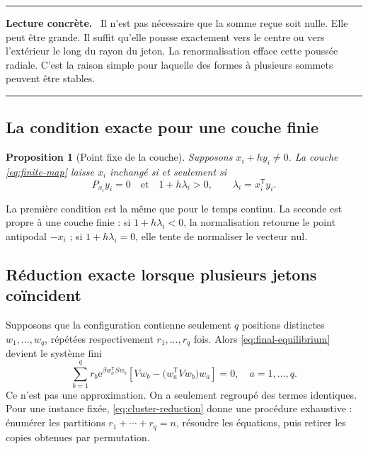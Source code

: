 \documentclass[11pt,a4paper]{article}
\newtheorem{proposition}[theorem]{Proposition}
\theoremstyle{definition}
\newcommand{\e}{\mathrm e}
\newcommand{\T}{\mathsf T}
\newenvironment{plainbox}
{\begin{center}\begin{minipage}{0.92\textwidth}\color{deepblue}\hrule\vspace{0.45em}\small\textbf{Lecture concrète.}\ \color{black}}
{\vspace{0.35em}\color{deepblue}\hrule\color{black}\end{minipage}\end{center}}
\begin{document}
\begin{plainbox}
Il n'est pas nécessaire que la somme reçue soit nulle. Elle peut être grande. Il suffit
qu'elle pousse exactement vers le centre ou vers l'extérieur le long du rayon du jeton.
La renormalisation efface cette poussée radiale. C'est la raison simple pour laquelle des
formes à plusieurs sommets peuvent être stables.
\end{plainbox}

\subsection{La condition exacte pour une couche finie}

\begin{proposition}[Point fixe de la couche]
Supposons $x_i+h y_i\neq0$. La couche \eqref{eq:finite-map} laisse $x_i$ inchangé si et
seulement si
\begin{equation}
 P_{x_i}y_i=0
 \quad\text{et}\quad
 1+h\lambda_i>0,
 \qquad \lambda_i=x_i^{\T}y_i.                             \label{eq:finite-fixed}
\end{equation}
\end{proposition}

La première condition est la même que pour le temps continu. La seconde est propre à
une couche finie : si $1+h\lambda_i<0$, la normalisation retourne le point antipodal
$-x_i$ ; si $1+h\lambda_i=0$, elle tente de normaliser le vecteur nul.

\subsection{Réduction exacte lorsque plusieurs jetons coïncident}

Supposons que la configuration contienne seulement $q$ positions distinctes
$w_1,\ldots,w_q$, répétées respectivement $r_1,\ldots,r_q$ fois. Alors
\eqref{eq:final-equilibrium} devient le système fini
\begin{equation}
 \boxed{\quad
 \sum_{b=1}^q r_b\e^{\beta w_a^{\T}Sw_b}
 \left[Vw_b-\bigl(w_a^{\T}Vw_b\bigr)w_a\right]=0,
 \quad a=1,\ldots,q.\quad}                                \label{eq:cluster-reduction}
\end{equation}
Ce n'est pas une approximation. On a seulement regroupé des termes identiques. Pour une
instance fixée, \eqref{eq:cluster-reduction} donne une procédure exhaustive : énumérer
les partitions $r_1+\cdots+r_q=n$, résoudre les équations, puis retirer les copies obtenues
par permutation.
\end{document}

